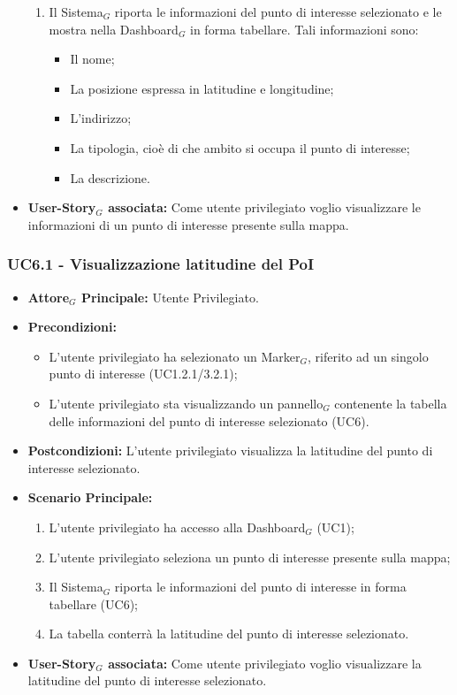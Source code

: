 \documentclass[10pt]{article}
\begin{document}
\begin{justify}
\begin{itemize}
\begin{enumerate}
            \item Il Sistema$_G$ riporta le informazioni del punto di interesse selezionato e le mostra nella Dashboard$_G$ in forma tabellare. Tali informazioni sono:
       \begin{itemize}
       \item Il nome;
       \item La posizione espressa in latitudine e longitudine;
       \item L'indirizzo;
       \item La tipologia, cioè di che ambito si occupa il punto di interesse;
       \item La descrizione.
       \end{itemize}
        \end{enumerate}
     \item \textbf{User-Story$_G$ associata:} Come utente privilegiato voglio visualizzare le informazioni di un punto di interesse presente sulla mappa. 
 \end{itemize}
 \subsubsection{\textbf{UC6.1 - Visualizzazione latitudine del PoI}}
 \begin{itemize}
     \item \textbf{Attore$_G$ Principale:} Utente Privilegiato.
     \item \textbf{Precondizioni:}
       \begin{itemize}
    	        \item L'utente privilegiato ha selezionato un Marker$_G$, riferito ad un singolo punto di interesse (UC1.2.1/3.2.1);
          \item L'utente privilegiato sta visualizzando un pannello$_G$ contenente la tabella delle informazioni del punto di interesse selezionato (UC6).
       \end{itemize}
     \item \textbf{Postcondizioni:} L'utente privilegiato visualizza la latitudine del punto di interesse selezionato.
     \item \textbf{Scenario Principale:}
        \begin{enumerate}
            \item L'utente privilegiato ha accesso alla Dashboard$_G$ (UC1);
            \item L'utente privilegiato seleziona un punto di interesse presente sulla mappa;
            \item Il Sistema$_G$ riporta le informazioni del punto di interesse in forma tabellare (UC6);
            \item La tabella conterrà la latitudine del punto di interesse selezionato.
        \end{enumerate}
     \item \textbf{User-Story$_G$ associata:} Come utente privilegiato voglio visualizzare la latitudine del punto di interesse selezionato. 
 \end{itemize}

\end{justify}
\end{document}
